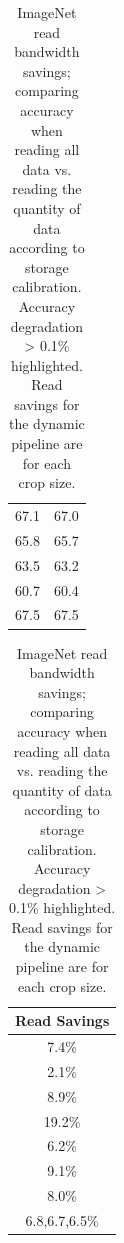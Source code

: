 \begin{table}
\begin{tabular}{|c|c|}
    67.1 & 67.0 \\ 
    65.8 & 65.7\\ 
    63.5 & 63.2 \\ 
    60.7 & {\color{red} 60.4}\\
    67.5 & 67.5 \\ 
    \end{tabular}
    \begin{tabular}{|c}
    \\
    Read Savings \\
    \hline
    7.4\%\\ 
    2.1\%\\ 
    8.9\%\\ 
    19.2\%\\ 
    6.2\%\\ 
    9.1\%\\ 
    8.0\% \\
    6.8,6.7,6.5\%\\ 
    \end{tabular}
    \caption{ImageNet read bandwidth savings; comparing accuracy when reading all data vs. reading the quantity of data according to storage calibration. Accuracy degradation > 0.1\% highlighted. Read savings for the dynamic pipeline are for each crop size.
    }
    \label{tab:imagenet_storage}
\end{table}


